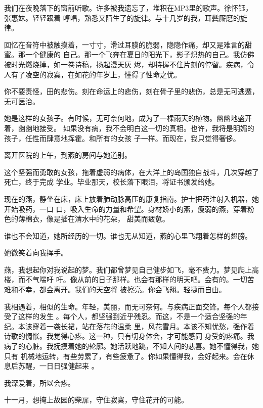 \documentclass[12pt,a4paper]{article}
\begin{document}
		我们在夜晚落下的窗前听歌。许多被我遗忘了，堆积在MP3里的歌声。徐怀钰，张惠妹。轻轻跟着
	哼唱，熟悉又陌生了的旋律。与十几岁的我，耳鬓厮磨的旋律。

		回忆在音符中被触摸着，一寸寸，滑过耳膜的脆弱，隐隐作痛，却又是难言的甜蜜。那一个健康的
	自己。那一个飞奔在夏日的阳光下，影子炽热的自己。我仿佛被时光燃烧掉，如一卷诗稿，扬起漫天灰
	烬，却持握不住片刻的停留。疾病，令人有了凌空的寂寞，在如花的年岁上，懂得了性命之忧。

		你不要责怪，田的悲伤。刻在命运上的悲伤，刻在骨子里的悲伤，总是无可逃遁，无可医治。

		她是这样的女孩子。有时候，无可奈何地，成为了一棵雨天的植物。幽幽地盛开着，幽幽地接受。
	如果没有病，我不会明白这一切的真相。也许，我将是明媚的孩子，任性而肆意地挥霍。和所有的女孩
	子一样。而现在，我只觉得奢侈。

		离开医院的上午，到燕的房间与她道别。

		这个坚强而勇敢的女孩，拖着虚弱的病体，在大洋上的岛国独自战斗，几次穿越了死亡，终于完成
	学业。毕业那天，校长落下眼泪，将证书颁发给她。

		现在的燕，静坐在床，床上放着肺动脉高压的康复指南。护士把药注射入机器，她开始吸药，一口
	口，吸入生命的力量和希望。身材娇小的燕，瘦弱的燕，穿着粉色的薄棉衣，像是插在清水中的花朵，
	甜美而疲惫。

		谁也不会知道，她所经历的一切。谁也无从知道，燕的心里飞翔着怎样的翅膀。

		她微笑着向我挥手。

		燕，我想起你对我说起的梦。我们都曾梦见自己健步如飞，毫不费力。梦见爬上高楼，而不气喘吁
	吁。像从前的日子那样。也会有那样的明天吧。会有的。一切苦难和不幸，都会离开。我们的天空将
	被擦亮。你会飞翔。轻捷而自由。

		我相遇着，相似的生命。年轻，美丽，而无可奈何。与疾病正面交锋。每个人都接受了这样的发生
	。每个人，都坚强到近乎残忍。而这，不是一个适合坚强的年纪。本该穿着一袭长裙，站在落花的温柔
	里，风花雪月。本该不知忧愁，强作着诗歌的惆怅。我觉得心疼。这一种，只有切身体会，才可能感同
	身受的疼痛。我病了的心脏。我抚摸着她的轮廓。她活跃地跳，不知人间的悲喜。她不懂得我，她只有
	机械地运转，有些劳累了，有些疲惫了。你如果懂得我，会好起来。会在休息后苏醒，一日日强健起来
	。

		我深爱着，所以会疼。

	\endwriting



		十一月，想掩上故园的柴扉，守住寂寞，守住花开的可能。
\end{document}
